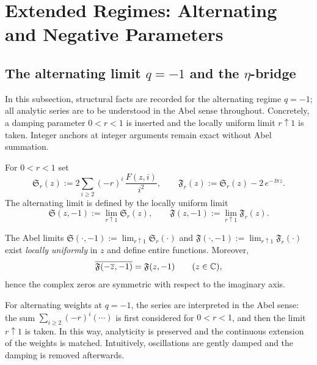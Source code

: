 \section{Extended Regimes: Alternating and Negative Parameters}

\subsection{The alternating limit \texorpdfstring{$q=-1$}{q=-1} and the \texorpdfstring{$\eta$}{eta}-bridge}
\label{sec:qminus1-eta}

In this subsection, structural facts are recorded for the alternating regime \(q=-1\); all analytic series are to be understood in the Abel sense throughout.
Concretely, a damping parameter \(0<r<1\) is inserted and the locally uniform limit \(r\uparrow1\) is taken.
Integer anchors at integer arguments remain exact without Abel summation.

\begin{definition}
For \(0<r<1\) set
\[
\mathfrak S_r(z):=2\sum_{i\ge2}(-r)^{i}\,\frac{F(z,i)}{i^2},
\qquad
\mathfrak F_r(z):=\mathfrak S_r(z)-2\,e^{-\,\ii\pi z}.
\]
The alternating limit is defined by the locally uniform limit
\[
\mathfrak S(z,-1):=\lim_{r\uparrow1}\mathfrak S_r(z),\qquad
\mathfrak F(z,-1):=\lim_{r\uparrow1}\mathfrak F_r(z).
\]
\end{definition}

\begin{proposition}\label{prop:qminus1-entire-sym}
The Abel limits \(\mathfrak S(\cdot,-1):=\lim_{r\uparrow1}\mathfrak S_r(\cdot)\) and \(\mathfrak F(\cdot,-1):=\lim_{r\uparrow1}\mathfrak F_r(\cdot)\) exist \emph{locally uniformly} in $z$ and define entire functions.
Moreover,
\[
\overline{\mathfrak F(-\overline{z},-1)}=\mathfrak F(z,-1)\qquad(z\in\mathbb{C}),
\]
hence the complex zeros are symmetric with respect to the imaginary axis.
\end{proposition}

\begin{remark}
For alternating weights at \(q=-1\), the series are interpreted in the Abel sense: the sum \(\sum_{i\ge2}(-r)^i(\cdots)\) is first considered for \(0<r<1\), and then the limit \(r\uparrow1\) is taken. In this way, analyticity is preserved and the continuous extension of the weights is matched. Intuitively, oscillations are gently damped and the damping is removed afterwards.
\end{remark}

